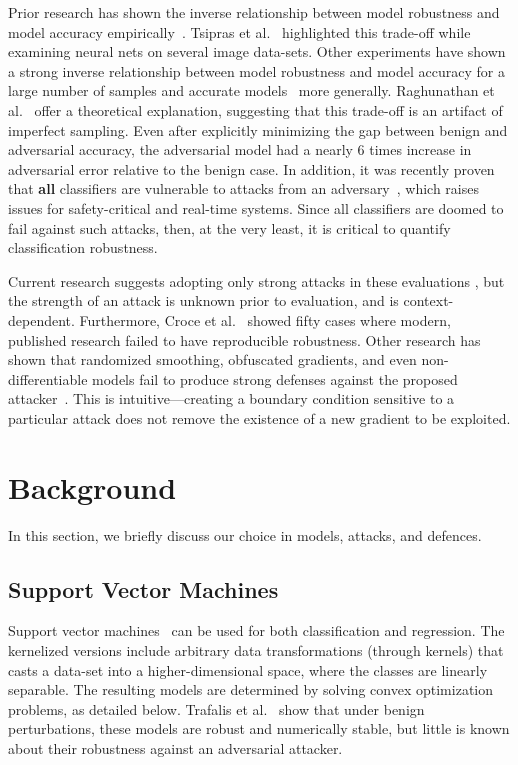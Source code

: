 \documentclass[runningheads]{llncs}
\begin{document}
Prior research has shown the inverse relationship between model robustness and model accuracy empirically~\cite{li2016general,tsipras2018robustness}. Tsipras et al.~\cite{tsipras2018robustness} highlighted this trade-off while examining neural nets on several image data-sets. Other experiments have shown a strong inverse relationship between model robustness and model accuracy for a large number of samples and accurate models~\cite{raghunathan2020understanding} more generally.
Raghunathan et al.~\cite{raghunathan2020understanding} offer a theoretical explanation, suggesting that this trade-off is an artifact of imperfect sampling. Even after explicitly minimizing the gap between benign and adversarial accuracy, the adversarial model had a nearly 6 times increase in adversarial error relative to the benign case. In addition, it was recently proven that \textbf{all} classifiers are vulnerable to attacks from an adversary~\cite{dohmatob2019generalized}, which raises issues for safety-critical and real-time systems. Since all classifiers are doomed to fail against such attacks, then, at the very least, it is critical to quantify classification robustness.

Current research suggests adopting only strong attacks in these evaluations \cite{carlini2019evaluating}, but the strength of an attack is unknown prior to evaluation, and is context-dependent. Furthermore, Croce et al.~\cite{croce2020reliable} showed fifty cases where modern, published research failed to have reproducible robustness. Other research has shown that randomized smoothing, obfuscated gradients, and even non-differentiable models fail to produce strong defenses against the proposed attacker~\cite{carlini2017towards,athalye2018obfuscated,uesato2018adversarial}. This is intuitive---creating a boundary condition sensitive to a particular attack does not remove the existence of a new gradient to be exploited. 


\section{Background}
In this section, we briefly discuss our choice in models, attacks, and defences.
\subsection{Support Vector Machines}

Support vector machines~\cite{cortes1995support} can be used for both classification and regression. The kernelized versions include arbitrary data transformations (through kernels) that casts a data-set into a higher-dimensional space, where the classes are linearly separable. The resulting models are determined by solving convex optimization problems, as detailed below. Trafalis et al.~\cite{trafalis2007robust} show that under benign perturbations, these models are robust and numerically stable, but little is known about their robustness against an adversarial attacker.
\end{document}
